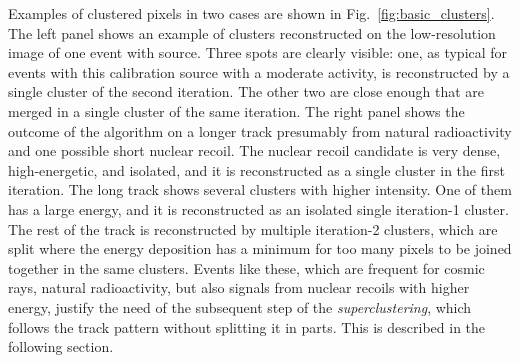 Examples of clustered pixels in two cases are shown in
Fig.~\ref{fig:basic_clusters}. The left panel shows an example of
clusters reconstructed on the low-resolution image of one event
with \fe source. Three spots are clearly visible: one, as typical for
events with this calibration source with a moderate activity, is
reconstructed by a single cluster of the second iteration. The other
two are close enough that are merged in a single cluster of the same
iteration. The right panel shows the outcome of the \idbscan algorithm
on a longer track presumably from natural radioactivity and one
possible short nuclear recoil.  The nuclear recoil candidate is very
dense, high-energetic, and isolated, and it is reconstructed as a single
cluster in the first iteration. The long track shows several clusters
with higher intensity. One of them has a large energy, and it is
reconstructed as an isolated single iteration-1 cluster. The rest of
the track is reconstructed by multiple iteration-2 clusters, which are
split where the energy deposition has a minimum for too many pixels to
be joined together in the same clusters. Events like these, which are
frequent for cosmic rays, natural radioactivity, but also signals from
nuclear recoils with higher energy, justify the need of the subsequent
step of the \textit{superclustering}, which follows the track pattern
without splitting it in parts. This is described in the following
section.
%
